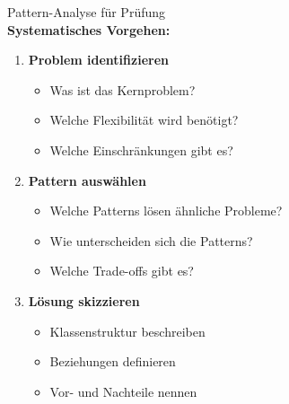 \begin{KR}{Pattern-Analyse für Prüfung}\\
\textbf{Systematisches Vorgehen:}
\begin{enumerate}
    \item \textbf{Problem identifizieren}
    \begin{itemize}
        \item Was ist das Kernproblem?
        \item Welche Flexibilität wird benötigt?
        \item Welche Einschränkungen gibt es?
    \end{itemize}
    
    \item \textbf{Pattern auswählen}
    \begin{itemize}
        \item Welche Patterns lösen ähnliche Probleme?
        \item Wie unterscheiden sich die Patterns?
        \item Welche Trade-offs gibt es?
    \end{itemize}
    
    \item \textbf{Lösung skizzieren}
    \begin{itemize}
        \item Klassenstruktur beschreiben
        \item Beziehungen definieren
        \item Vor- und Nachteile nennen
    \end{itemize}
\end{enumerate}
\end{KR}

